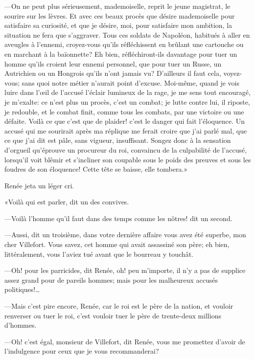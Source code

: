 —On ne peut plus sérieusement, mademoiselle, reprit le jeune magistrat, le sourire sur les lèvres. Et avec ces beaux procès que désire mademoiselle pour satisfaire sa curiosité, et que je désire, moi, pour satisfaire mon ambition, la situation ne fera que s'aggraver. Tous ces soldats de Napoléon, habitués à aller en aveugles à l'ennemi, croyez-vous qu'ils réfléchissent en brûlant une cartouche ou en marchant à la baïonnette? Eh bien, réfléchiront-ils davantage pour tuer un homme qu'ils croient leur ennemi personnel, que pour tuer un Russe, un Autrichien ou un Hongrois qu'ils n'ont jamais vu? D'ailleurs il faut cela, voyez-vous; sans quoi notre métier n'aurait point d'excuse. Moi-même, quand je vois luire dans l'œil de l'accusé l'éclair lumineux de la rage, je me sens tout encouragé, je m'exalte: ce n'est plus un procès, c'est un combat; je lutte contre lui, il riposte, je redouble, et le combat finit, comme tous les combats, par une victoire ou une défaite. Voilà ce que c'est que de plaider! c'est le danger qui fait l'éloquence. Un accusé qui me sourirait après ma réplique me ferait croire que j'ai parlé mal, que ce que j'ai dit est pâle, sans vigueur, insuffisant. Songez donc à la sensation d'orgueil qu'éprouve un procureur du roi, convaincu de la culpabilité de l'accusé, lorsqu'il voit blêmir et s'incliner son coupable sous le poids des preuves et sous les foudres de son éloquence! Cette tête se baisse, elle tombera.»

Renée jeta un léger cri.

«Voilà qui est parler, dit un des convives.

—Voilà l'homme qu'il faut dans des temps comme les nôtres! dit un second.

—Aussi, dit un troisième, dans votre dernière affaire vous avez été superbe, mon cher Villefort. Vous savez, cet homme qui avait assassiné son père; eh bien, littéralement, vous l'aviez tué avant que le bourreau y touchât.

—Oh! pour les parricides, dit Renée, oh! peu m'importe, il n'y a pas de supplice assez grand pour de pareils hommes; mais pour les malheureux accusés politiques!\dots

—Mais c'est pire encore, Renée, car le roi est le père de la nation, et vouloir renverser ou tuer le roi, c'est vouloir tuer le père de trente-deux millions d'hommes.

—Oh! c'est égal, monsieur de Villefort, dit Renée, vous me promettez d'avoir de l'indulgence pour ceux que je vous recommanderai?

